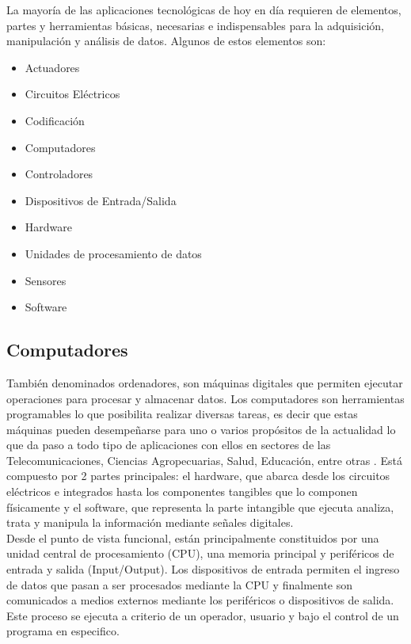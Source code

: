 
La mayoría de las aplicaciones tecnológicas de hoy en día requieren  de elementos, partes y herramientas básicas, necesarias e indispensables para la adquisición, manipulación y análisis de datos. Algunos de estos elementos son:\\
\begin{multicols}{2}
\begin{itemize}
    \item Actuadores
    \item Circuitos Eléctricos
    \item Codificación
    \item Computadores
    \item Controladores
    \item Dispositivos de Entrada/Salida 
    \item Hardware
    \item Unidades de procesamiento de datos
    \item Sensores
    \item Software
\end{itemize}
\end{multicols}


\subsection{Computadores}

También denominados ordenadores, son máquinas digitales que permiten ejecutar operaciones para procesar y almacenar datos.
Los computadores son herramientas programables lo que posibilita realizar diversas tareas, es decir que estas máquinas pueden desempeñarse para uno o varios propósitos de la actualidad lo que da paso a todo tipo de aplicaciones con ellos en sectores de las Telecomunicaciones, Ciencias Agropecuarias, Salud, Educación, entre otras \cite{defpc}. Está compuesto por 2 partes principales: el hardware, que abarca desde los circuitos eléctricos e integrados hasta los componentes tangibles que lo componen físicamente y el software, que representa la parte intangible que ejecuta analiza, trata y manipula la información mediante señales digitales.\\

Desde el punto de vista funcional, están principalmente constituidos por una unidad central de procesamiento (CPU), una memoria principal y periféricos de entrada y salida (Input/Output). Los dispositivos de entrada permiten el ingreso de datos que pasan a ser procesados mediante la CPU y finalmente son comunicados a medios externos mediante los periféricos o dispositivos de salida. Este proceso se ejecuta a criterio de un operador, usuario y bajo el control de un programa en especifico.

